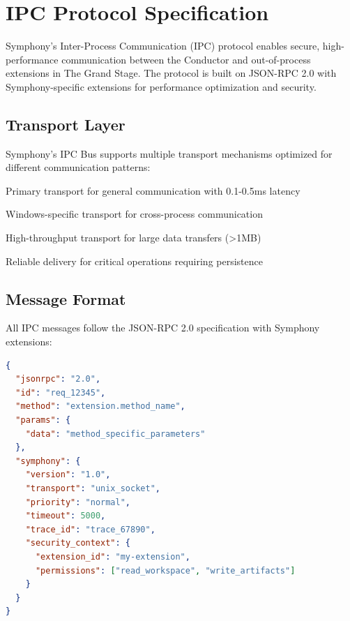 \section*{IPC Protocol Specification}

Symphony's Inter-Process Communication (IPC) protocol enables secure, high-performance communication between the Conductor and out-of-process extensions in The Grand Stage. The protocol is built on JSON-RPC 2.0 with Symphony-specific extensions for performance optimization and security.

\subsection*{Transport Layer}

Symphony's IPC Bus supports multiple transport mechanisms optimized for different communication patterns:

\begin{description}[leftmargin=4cm,labelwidth=3.5cm]
\item[\textbf{Unix Domain Sockets}] Primary transport for general communication with 0.1-0.5ms latency
\item[\textbf{Named Pipes}] Windows-specific transport for cross-process communication
\item[\textbf{Shared Memory}] High-throughput transport for large data transfers (>1MB)
\item[\textbf{Message Queues}] Reliable delivery for critical operations requiring persistence
\end{description}

\subsection*{Message Format}

All IPC messages follow the JSON-RPC 2.0 specification with Symphony extensions:

\begin{lstlisting}[language=JSON,caption={IPC Message Structure}]
{
  "jsonrpc": "2.0",
  "id": "req_12345",
  "method": "extension.method_name",
  "params": {
    "data": "method_specific_parameters"
  },
  "symphony": {
    "version": "1.0",
    "transport": "unix_socket",
    "priority": "normal",
    "timeout": 5000,
    "trace_id": "trace_67890",
    "security_context": {
      "extension_id": "my-extension",
      "permissions": ["read_workspace", "write_artifacts"]
    }
  }
}
\end{lstlisting}


